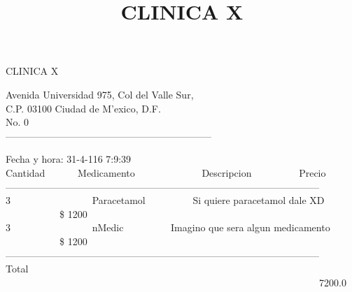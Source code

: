 \documentclass[10pt,a4paper]{letter}
\title{\bf CLINICA X}
\begin{document}
\begin{center}
{\scshape\LARGE CLINICA X\par}
{Avenida Universidad 975, Col del Valle Sur,\\}
{C.P. 03100 Ciudad de M'exico, D.F.}\\ 
{No. 0}\\ 
---------------------------------------------------------------
\end{center}

Fecha y hora: 31-4-116 7:9:39\\

Cantidad \ \ \ \ \ \ Medicamento \ \ \ \ \ \ \ \ \ \ \ \ \  Descripcion  \ \ \ \ \ \ \ \ \ Precio \\
------------------------------------------------------------------------------------------------ \\
3 \ \ \ \ \ \ \ \ \ \ \ \ \ \ \ \ Paracetamol \ \ \ \ \ \ \ \ \ Si quiere paracetamol dale XD \ \ \ \ \ \ \ \ \ \ \ \$ 1200 \\
3 \ \ \ \ \ \ \ \ \ \ \ \ \ \ \ \ nMedic \ \ \ \ \ \ \ \ \ Imagino que sera algun medicamento \ \ \ \ \ \ \ \ \ \ \ \$ 1200 \\

------------------------------------------------------------------------------------------------ \\
Total	\ \ \ \ \ \ \ \ \ \ \ \ \  \ \ \ \ \ \ \ \ \ \ \ \ \ \ \ \ \ \ \ \ \ \ \ \ \ \ \ \ \ \ \ \ \ \ \ \ \ \ \ \ \  \ \ \ \ \ \ \ \ \ \ 7200.0 \\
 
\end{document}
